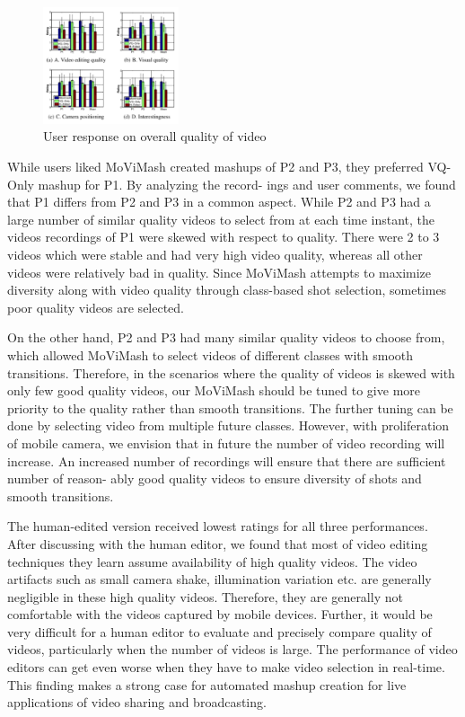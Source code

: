 \documentclass{sig-alternate}
\begin{document}
\begin{figure}[htp]
\centering
\includegraphics[width = 4cm]{images/img7.png}
\caption{User response on overall quality of video}
\end{figure}


While users liked MoViMash created mashups of P2 and P3,
they preferred VQ-Only mashup for P1. By analyzing the record-
ings and user comments, we found that P1 differs from P2 and P3 in
a common aspect. While P2 and P3 had a large number of similar
quality videos to select from at each time instant, the videos recordings of P1 were skewed with respect to quality. There were 2 to 3
videos which were stable and had very high video quality, whereas
all other videos were relatively bad in quality. Since MoViMash
attempts to maximize diversity along with video quality through
class-based shot selection, sometimes poor quality videos are selected.

On the other hand, P2 and P3 had many similar quality videos
to choose from, which allowed MoViMash to select videos of different classes with smooth transitions. Therefore, in the scenarios
where the quality of videos is skewed with only few good quality
videos, our MoViMash should be tuned to give more priority to
the quality rather than smooth transitions. The further tuning can
be done by selecting video from multiple future classes. However,
with proliferation of mobile camera, we envision that in future the
number of video recording will increase. An increased number of
recordings will ensure that there are sufficient number of reason-
ably good quality videos to ensure diversity of shots and smooth
transitions.


The human-edited version received lowest ratings for all three
performances. After discussing with the human editor, we found
that most of video editing techniques they learn assume availability
of high quality videos. The video artifacts such as small camera shake, illumination variation etc. are generally negligible in these
high quality videos. Therefore, they are generally not comfortable
with the videos captured by mobile devices. Further, it would be
very difficult for a human editor to evaluate and precisely compare
quality of videos, particularly when the number of videos is large.
The performance of video editors can get even worse when they
have to make video selection in real-time. This finding makes a
strong case for automated mashup creation for live applications of
video sharing and broadcasting.
\end{document}
